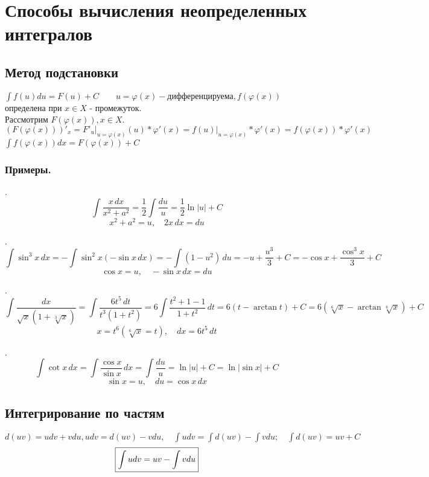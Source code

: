 \documentclass[../main.tex]{subfiles}
\begin{document}
\newpage
{}
\section{Способы вычисления неопределенных интегралов}
\subsection{Метод подстановки}
$\displaystyle\int f(u)du=F(u)+C\qquad u=\varphi(x) - \text{дифференцируема}, f(\varphi(x))$ определена при $x \in X\text{ - промежуток}.$\\
Рассмотрим $F(\varphi(x)),x\in X.$ $(F(\varphi(x)))'_{x}=F'_{u}\bigg|_{u=\varphi(x)}(u)*\varphi'(x)=f(u)\bigg|_{u=\varphi(x)}*\varphi'(x)=f(\varphi(x))*\varphi'(x)$\\
$\displaystyle\int f(\varphi(x))dx=F(\varphi(x))+C$\\
\fbox{%
\begin{minipage}{\linewidth}
\[
\displaystyle\int f(\varphi(x))\underbrace{\varphi'(x)dx}_{du}=\int f(u)du\bigg|_{u=\varphi(x)}
\]
\[
\displaystyle\int f(x)dx\bigg|_{x=\psi(t)}=\int f(\psi(t))\psi'(t)dt\bigg|_{t=\psi^{-1}(x)}
\]
\end{minipage}
}

\subsubsection{Примеры.}

. 
\[
\int \frac{x \, dx}{x^{2} + a^{2}} = \frac{1}{2} \int \frac{du}{u} = \frac{1}{2} \ln{|u|} + C
\]
\[
x^{2} + a^{2} = u, \quad 2x \, dx = du
\]

. 
\[
\int \sin^{3}{x} \, dx = -\int \sin^{2}{x} (-\sin{x} \, dx) = -\int (1 - u^{2}) \, du = -u + \frac{u^{3}}{3} + C = -\cos{x} + \frac{\cos^{3}{x}}{3} + C
\]
\[
\cos{x} = u, \quad -\sin{x} \, dx = du
\]

. 
\[
\int \frac{dx}{\sqrt{x}(1 + \sqrt[3]{x})} = \int \frac{6t^{5} \, dt}{t^{3}(1 + t^{2})} = 6 \int \frac{t^{2} + 1 - 1}{1 + t^{2}} \, dt = 6(t - \arctan{t}) + C = 6(\sqrt[6]{x} - \arctan{\sqrt[6]{x}}) + C
\]
\[
x = t^{6} (\sqrt[6]{x} = t), \quad dx = 6t^{5} \, dt
\]

. 
\[
\int \cot{x} \, dx = \int \frac{\cos{x}}{\sin{x}} \, dx = \int \frac{du}{u} = \ln{|u|} + C = \ln{|\sin{x}|} + C
\]
\[
\sin{x} = u, \quad du = \cos{x} \, dx
\]

\subsection{Интегрирование по частям}
$d(uv)=udv+vdu,udv=d(uv)-vdu,\quad \displaystyle\int udv=\int d(uv)-\int vdu;\quad \int d(uv)=uv+C$\\
$$\fbox{\(\displaystyle \int  udv=uv-\int vdu\)}$$
\end{document}
